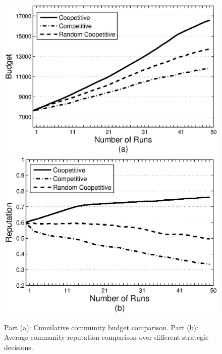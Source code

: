 \begin{figure}%
\includegraphics[scale=0.47]{graphbgtmed.eps}
\includegraphics[scale=0.47]{graphrep.eps}
\caption{Part (a): Cumulative community budget comparison. Part
(b): Average community reputation comparison over different
strategic decisions.} \label{Graph1}
\end{figure}





